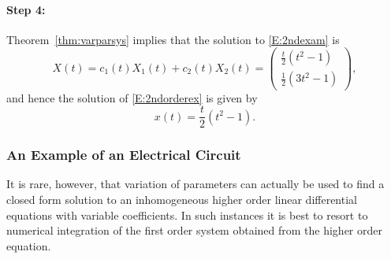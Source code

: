 \documentclass{ximera}
\begin{document}
\paragraph{Step 4:}  Theorem~\ref{thm:varparsys} implies that the 
solution to \eqref{E:2ndexam} is
\[
X(t) = c_1(t)X_1(t) + c_2(t)X_2(t) = \left(\begin{array}{c}
\frac{t}{2}(t^2-1)\\ \frac{1}{2}(3t^2-1) \end{array}\right),
\]
and hence the solution of \eqref{E:2ndorderex} is given by
\[
x(t) = \frac{t}{2}(t^2-1).
\]

\subsubsection*{An Example of an Electrical Circuit}

It is rare, however, that variation of parameters can actually be 
used to find a closed form solution 
to an inhomogeneous higher order 
linear differential equations with variable coefficients.  In such 
instances it is best to resort to numerical integration of the first 
order system obtained from the higher order equation.   
\end{document}
